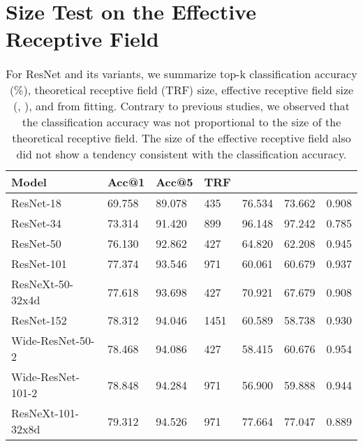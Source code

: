 \documentclass[letterpaper]{article} \usepackage{aaai22}  \usepackage{times}  \usepackage{helvet}  \usepackage{courier}  \usepackage[hyphens]{url}  \usepackage{graphicx} \urlstyle{rm} \def\UrlFont{\rm}  \usepackage{natbib}  \usepackage{caption} \DeclareCaptionStyle{ruled}{labelfont=normalfont,labelsep=colon,strut=off} \frenchspacing  \setlength{\pdfpagewidth}{8.5in}  \setlength{\pdfpageheight}{11in}  \usepackage{algorithm}
\begin{document}
\section{Size Test on the Effective Receptive Field}
\label{sec:Size_Test_on_the_Effective_Receptive_Field}

\begin{table*}[t!]
	\centering
	\begin{tabular}{l|l|l|l|l|l|l}
		\toprule
        \textbf{Model}    & \textbf{Acc@1} & \textbf{Acc@5} & \textbf{TRF} &  &  &  \\
\midrule
		ResNet-18         & 69.758         & 89.078         & 435          & 76.534         & 73.662         & 0.908 \\
		ResNet-34         & 73.314         & 91.420         & 899          & 96.148         & 97.242         & 0.785 \\
		ResNet-50         & 76.130         & 92.862         & 427          & 64.820         & 62.208         & 0.945 \\
		ResNet-101        & 77.374         & 93.546         & 971          & 60.061         & 60.679         & 0.937 \\
		ResNeXt-50-32x4d  & 77.618         & 93.698         & 427          & 70.921         & 67.679         & 0.908 \\
		ResNet-152        & 78.312         & 94.046         & 1451         & 60.589         & 58.738         & 0.930 \\
		Wide-ResNet-50-2  & 78.468         & 94.086         & 427          & 58.415         & 60.676         & 0.954 \\
		Wide-ResNet-101-2 & 78.848         & 94.284         & 971          & 56.900         & 59.888         & 0.944 \\
		ResNeXt-101-32x8d & 79.312         & 94.526         & 971          & 77.664         & 77.047         & 0.889 \\
		\bottomrule
	\end{tabular}
\caption{For ResNet and its variants, we summarize top-k classification accuracy (\%), theoretical receptive field (TRF) size, effective receptive field size (, ), and  from fitting. Contrary to previous studies, we observed that the classification accuracy was not proportional to the size of the theoretical receptive field. The size of the effective receptive field also did not show a tendency consistent with the classification accuracy.}
	\label{tab:rf_for_imagenet}
\end{table*}
\end{document}

